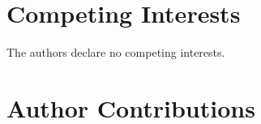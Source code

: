 \documentclass[aps,pra,reprint,amsmath,amssymb]{revtex4-2}
\begin{document}
\section*{Competing Interests}

The authors declare no competing interests.

\section*{Author Contributions}



\newpage
\appendix

\begin{widetext}





\end{widetext}
\end{document}
